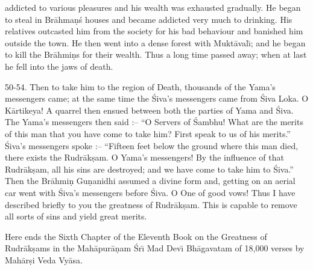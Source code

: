 addicted to various pleasures and his wealth was exhausted gradually. He began to steal in Br\=ahma\d{n}\'s houses and became addicted very much to drinking. His relatives outcasted him from the society for his bad behaviour and banished him outside the town. He then went into a dense forest with Mukt\=aval\={\i}; and he began to kill the Br\=ahmi\d{n}s for their wealth. Thus a long time passed away; when at last he fell into the jaws of death.

50-54. Then to take him to the region of Death, thousands of the Yama's messengers came; at the same time the \'Siva's messengers came from \'Siva Loka. O K\=artikeya! A quarrel then ensued between both the parties of Yama and \'Siva. The Yama's messengers then said :-- ``O Servers of \'Sambhu! What are the merits of this man that you have come to take him? First speak to us of his merits.'' \'Siva's messengers spoke :-- ``Fifteen feet below the ground where this man died, there exists the Rudr\=ak\d{s}am. O Yama's messengers! By the influence of that Rudr\=ak\d{s}am, all his sins are destroyed; and we have come to take him to \'Siva.'' Then the Br\=ahmi\d{n} Gu\d{n}anidhi assumed a divine form and, getting on an aerial car went with \'Siva's messengers before \'Siva. O One of good vows! Thus I have described briefly to you the greatness of Rudr\=ak\d{s}am. This is capable to remove all sorts of sins and yield great merits.

Here ends the Sixth Chapter of the Eleventh Book on the Greatness of Rudr\=ak\d{s}ams in the Mah\=apur\=a\d{n}am \'Sr\={\i} Mad Dev\={\i} Bh\=agavatam of 18,000 verses by Mah\=ar\d{s}i Veda Vy\=asa.



